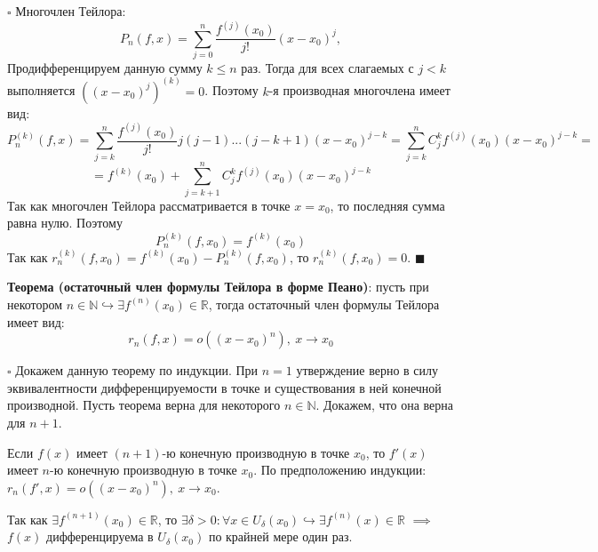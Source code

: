 \documentclass[12pt, a4paper, reqno]{article}
\begin{document}
    $\square$ Многочлен Тейлора:
    \begin{equation*}
        P_n(f, x) = \sum\limits_{j = 0}^{n}\dfrac{f^{(j)}(x_0)}{j!}(x - x_0)^j,
    \end{equation*}
    Продифференцируем данную сумму $k \leq n$ раз. Тогда для всех слагаемых с $j < k$ выполняется
    $((x - x_0)^{j})^{(k)} = 0$. Поэтому $k$-я производная многочлена имеет вид:
    \begin{equation*}
        P_{n}^{(k)}(f, x) =
        \sum\limits_{j = k}^{n}\dfrac{f^{(j)}(x_0)}{j!}j(j - 1)...(j - k + 1)(x - x_0)^{j - k} =
        \sum\limits_{j = k}^{n}C_{j}^{k}f^{(j)}(x_0)(x - x_0)^{j - k} =
    \end{equation*}
    \begin{equation*}
        = f^{(k)}(x_0) + \sum\limits_{j = k + 1}^{n}C_{j}^{k}f^{(j)}(x_0)(x - x_0)^{j - k}
    \end{equation*}
    Так как многочлен Тейлора рассматривается в точке $x = x_0$, то последняя сумма равна нулю.
    Поэтому
    \begin{equation*}
        P_{n}^{(k)}(f, x_0) = f^{(k)}(x_0)
    \end{equation*}
    Так как $r_{n}^{(k)}(f, x_0) = f^{(k)}(x_0) - P_{n}^{(k)}(f, x_0)$, то $r_{n}^{(k)}(f, x_0) = 0$.
    $\blacksquare$

    \textbf{Теорема (остаточный член формулы Тейлора в форме Пеано)}: пусть при некотором
    $n\in\mathbb{N}\hookrightarrow\exists f^{(n)}(x_0)\in\mathbb{R}$, тогда остаточный член формулы
    Тейлора имеет вид:
    \begin{equation*}
        r_n(f, x) = o((x - x_0)^n),\ x\to x_0
    \end{equation*}

    $\square$ Докажем данную теорему по индукции. При $n = 1$ утверждение верно в силу
    эквивалентности дифференцируемости в точке и существования в ней конечной производной. Пусть
    теорема верна для некоторого $n\in\mathbb{N}$. Докажем, что она верна для $n + 1$.

    Если $f(x)$ имеет $(n + 1)$-ю конечную производную в точке $x_0$, то $f'(x)$ имеет $n$-ю
    конечную производную в точке $x_0$. По предположению индукции: $r_n(f', x) = o((x - x_0)^n),\
    x\to x_0$.

    Так как $\exists f^{(n + 1)}(x_0)\in\mathbb{R}$, то $\exists\delta > 0: \forall x\in
    U_{\delta}(x_0)\hookrightarrow \exists f^{(n)}(x)\in\mathbb{R}$ $\implies$ $f(x)$
    дифференцируема в $U_{\delta}(x_0)$ по крайней мере один раз.
\end{document}
